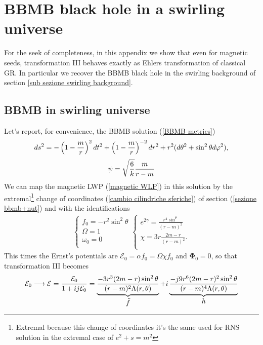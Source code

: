 \chapter{BBMB black hole in a swirling universe} \label{appendice C}
For the seek of completeness, in this appendix we show that even for magnetic seeds, transformation III behaves exactly as Ehlers transformation of classical GR. In particular we recover the BBMB black hole in the swirling background of section \ref{sub sezione swirling background}. 
\section{BBMB in swirling universe}
Let's report, for convenience, the BBMB solution (\ref{BBMB metrics}) 
\begin{equation}
    ds^2 = -\left(1-\frac{m}{r}\right)^2dt^2 + \left(1-\frac{m}{r}\right)^{-2}dr^2 + r^2(d\theta^2 + \sin^2\theta d\varphi^2),
    \notag
\end{equation}
\begin{equation}
    \psi = \sqrt{\frac{6}{k}}\frac{m}{r-m} \notag
\end{equation}
We can map the magnetic LWP (\ref{magnetic WLP}) in this solution by the extremal\footnote{Extremal because this change of coordinates it's the same used for RNS solution in the extremal case of $e^2+s = m^2$} change of coordinates (\ref{cambio cilindriche sferiche}) of section (\ref{sezione bbmb+nut}) and with the identifications 
\begin{equation*}
    \begin{aligned}
        \begin{cases}
           \displaystyle f_0  = -r^2\sin^2\theta \\
            \Omega = 1 \\
            \omega_0 = 0 \\
        \end{cases}
        \begin{cases}
           \displaystyle e^{2\gamma} = \frac{r^4\sin^\theta}{(r-m)^2} \\
            \displaystyle \chi = 3r\frac{2m-r}{(r-m)^2}. \\
        \end{cases}
    \end{aligned}
\end{equation*}
This times the Ernst's potentials are $\mathcal{E}_0=\alpha f_0=\Omega\chi f_0$ and $\boldsymbol{\Phi}_0=0$, so that transformation III becomes
\begin{equation}
    \mathcal{E}_0 \longrightarrow \mathcal{E} = \frac{\mathcal{E}_0}{1+ij\mathcal{E}_0} = \underbrace{\frac{-3r^3(2m-r)\sin^2\theta}{(r-m)^2\Lambda(r,\theta)}}_{\displaystyle \Tilde{f}} + i \underbrace{\frac{-j9r^6(2m-r)^2\sin^2\theta}{(r-m)^4\Lambda(r,\theta)}}_{\displaystyle h}
\end{equation}
